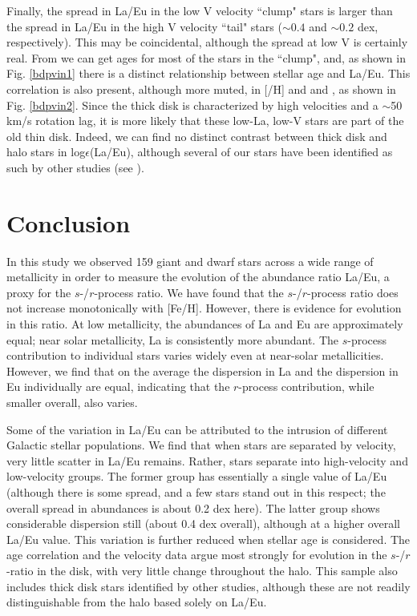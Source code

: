 \documentclass[12pt,preprint]{aastex}
\begin{document}
{Finally, the spread in La/Eu in the low V velocity ``clump" stars is larger than the spread in La/Eu in the high V velocity ``tail" stars ($\sim 0.4$ and $\sim 0.2$ dex, respectively).  This may be coincidental, although the spread at low V is certainly real.  From \citet{Edvardsson1993} we can get ages for most of the stars in the ``clump", and, as shown in Fig. \ref{bdpvin1} there is a distinct relationship between stellar age and La/Eu.  This correlation is also present, although more muted, in [/H] and  and , as shown in Fig. \ref{bdpvin2}.  Since the thick disk is characterized by high velocities and a $\sim$50 km/s rotation lag, it is more likely that these  low-La, low-V stars are part of the old thin disk.  Indeed, we can find no distinct contrast between thick disk and halo stars in log$\epsilon$(La/Eu), although several of our stars have been identified as such by other studies (see \citealt{Fuhrmann1998}).

{\section{Conclusion} \label{con}}


In this study we observed 159 giant and dwarf stars across a wide range of metallicity in order to measure the evolution of the abundance ratio La/Eu, a proxy for the $s$-/$r$-process ratio.  We   have found that the $s$-/$r$-process ratio does not increase monotonically with [Fe/H].  However, there is evidence for evolution in this ratio.  At low metallicity, the abundances of La and Eu are approximately equal; near solar metallicity, La is consistently more abundant.   The $s$-process contribution to individual stars varies widely even at near-solar metallicities.  However, we find that on the average the dispersion in La and the dispersion in Eu individually are equal, indicating that the $r$-process contribution, while smaller overall, also varies.    

Some of the variation in La/Eu can be attributed to the intrusion of different Galactic stellar populations.  We  find that when stars are separated by velocity, very little scatter in La/Eu remains.  Rather, stars separate into  high-velocity and low-velocity groups.  The former group has essentially a single value of La/Eu (although there is some spread, and a few stars stand out in this respect; the overall spread in abundances is about 0.2 dex here).  The latter group shows considerable dispersion still (about 0.4 dex overall), although at a higher overall La/Eu value. This variation is further reduced when stellar age is considered.  The age correlation and the velocity data argue  most strongly for evolution in the $s$-/$r$-ratio in the  disk, with very little change throughout the halo.  This sample also includes thick disk stars identified by other studies, although these are not readily distinguishable from the halo based solely on La/Eu.

}
\end{document}
